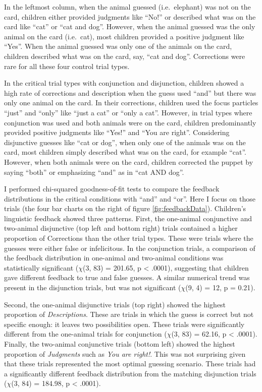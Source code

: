 \documentclass[oneside]{report}
\theoremstyle{definition}
\theoremstyle{definition}
\theoremstyle{definition}
\theoremstyle{remark}
\begin{document}
In the leftmost column, when the animal guessed (i.e.~elephant) was not
on the card, children either provided judgments like ``No!'' or
described what was on the card like ``cat'' or ``cat and dog''. However,
when the animal guessed was the only animal on the card (i.e.~cat), most
children provided a positive judgment like ``Yes''. When the animal
guessed was only one of the animals on the card, children described what
was on the card, say, ``cat and dog''. Corrections were rare for all
these four control trial types.

In the critical trial types with conjunction and disjunction, children
showed a high rate of corrections and description when the guess used
``and'' but there was only one animal on the card. In their corrections,
children used the focus particles ``just'' and ``only'' like ``just a
cat'' or ``only a cat''. However, in trial types where conjunction was
used and both animals were on the card, children predominantly provided
positive judgments like ``Yes!'' and ``You are right''. Considering
disjunctive guesses like ``cat or dog'', when only one of the animals
was on the card, most children simply described what was on the card,
for example ``cat''. However, when both animals were on the card,
children corrected the puppet by saying ``both'' or emphasizing ``and''
as in ``cat AND dog''.

I performed chi-squared goodness-of-fit tests to compare the feedback
distributions in the critical conditions with ``and'' and ``or''. Here I
focus on those trials (the four bar charts on the right of figure
\ref{fig:feedbackData}). Children's linguistic feedback showed three
patterns. First, the one-animal conjunctive and two-animal disjunctive
(top left and bottom right) trials contained a higher proportion of
Corrections than the other trial types. These were trials where the
guesses were either false or infelicitous. In the conjunction trials, a
comparison of the feedback distribution in one-animal and two-animal
conditions was statistically significant (\(\chi\)(3, 83) = 201.65, p
\textless{} .0001), suggesting that children gave different feedback to
true and false guesses. A similar numerical trend was present in the
disjunction trials, but was not significant (\(\chi\)(9, 4) = 12, p =
0.21).

Second, the one-animal disjunctive trials (top right) showed the highest
proportion of \emph{Descriptions}. These are trials in which the guess
is correct but not specific enough: it leaves two possibilities open.
These trials were significantly different from the one-animal trials for
conjunction (\(\chi\)(3, 83) = 62.16, p \textless{} .0001). Finally, the
two-animal conjunctive trials (bottom left) showed the highest
proportion of \emph{Judgments} such as \emph{You are right!}. This was
not surprising given that these trials represented the most optimal
guessing scenario. These trials had a significantly different feedback
distribution from the matching disjunction trials (\(\chi\)(3, 84) =
184.98, p \textless{} .0001).
\end{document}
